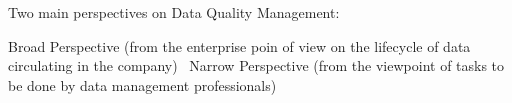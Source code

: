 Two main perspectives on Data Quality Management:

Broad Perspective (from the enterprise poin of view on the lifecycle of data circulating in the company)~\cite{book:dama}
Narrow Perspective (from the viewpoint of tasks to be done by data management professionals)~\cite{pres:dcam}















